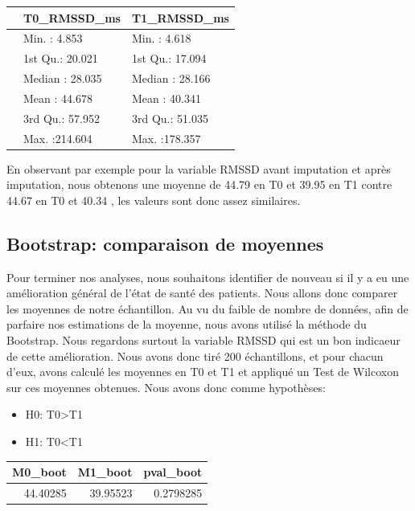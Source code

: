 \documentclass[]{article}
\providecommand{\tightlist}{%
  \setlength{\itemsep}{0pt}\setlength{\parskip}{0pt}}
\begin{document}
\begin{table}[H]
\centering
\begin{tabular}{l|l|l}
\hline
  &  T0\_RMSSD\_ms &  T1\_RMSSD\_ms\\
\hline
 & Min.   :  4.853 & Min.   :  4.618\\
\hline
 & 1st Qu.: 20.021 & 1st Qu.: 17.094\\
\hline
 & Median : 28.035 & Median : 28.166\\
\hline
 & Mean   : 44.678 & Mean   : 40.341\\
\hline
 & 3rd Qu.: 57.952 & 3rd Qu.: 51.035\\
\hline
 & Max.   :214.604 & Max.   :178.357\\
\hline
\end{tabular}
\end{table}

En observant par exemple pour la variable RMSSD avant imputation et
après imputation, nous obtenons une moyenne de 44.79 en T0 et 39.95 en
T1 contre 44.67 en T0 et 40.34 , les valeurs sont donc assez similaires.

\hypertarget{bootstrap-comparaison-de-moyennes}{%
\subsection{Bootstrap: comparaison de
moyennes}\label{bootstrap-comparaison-de-moyennes}}

Pour terminer nos analyses, nous souhaitons identifier de nouveau si il
y a eu une amélioration général de l'état de santé des patients. Nous
allons donc comparer les moyennes de notre échantillon. Au vu du faible
de nombre de données, afin de parfaire nos estimations de la moyenne,
nous avons utilisé la méthode du Bootstrap. Nous regardons surtout la
variable RMSSD qui est un bon indicaeur de cette amélioration. Nous
avons donc tiré 200 échantillons, et pour chacun d'eux, avons calculé
les moyennes en T0 et T1 et appliqué un Test de Wilcoxon sur ces
moyennes obtenues. Nous avons donc comme hypothèses:

\begin{itemize}
\tightlist
\item
  H0: T0\textgreater{}T1
\item
  H1: T0\textless{}T1
\end{itemize}

\begin{table}[H]
\centering
\begin{tabular}{r|r|r}
\hline
M0\_boot & M1\_boot & pval\_boot\\
\hline
44.40285 & 39.95523 & 0.2798285\\
\hline
\end{tabular}
\end{table}
\end{document}
